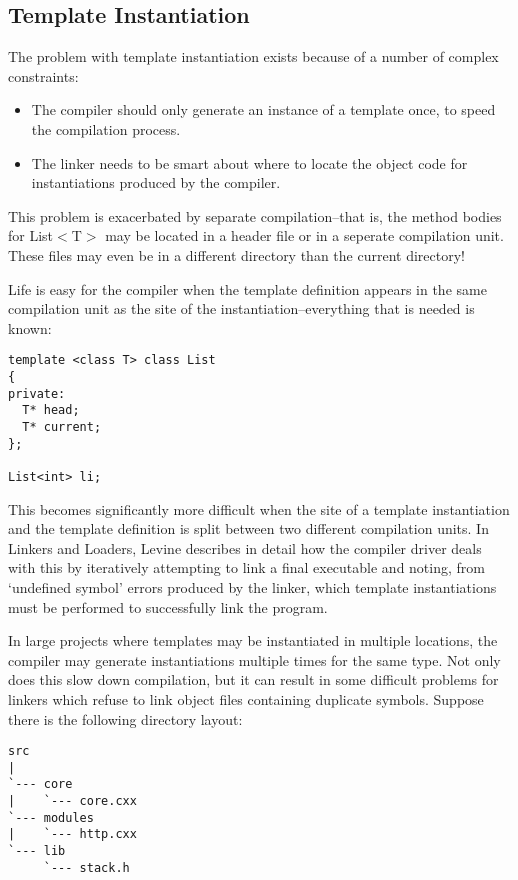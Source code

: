 \subsection{Template Instantiation}

The problem with template instantiation exists because of a number of complex constraints:

\begin{itemize}
\item The compiler should only generate an instance of a template once, to speed the compilation process.
\item The linker needs to be smart about where to locate the object code for instantiations produced by the compiler. 
\end{itemize}

This problem is exacerbated by separate compilation--that is, the method 
bodies for List$<$T$>$ may be located in a header file or in a seperate 
compilation unit. These files may even be in a different directory than the 
current directory!

Life is easy for the compiler when the template definition appears in the same compilation unit as the site of the instantiation--everything that is needed is known: 

\begin{Verbatim}[frame=single]
template <class T> class List
{
private:
  T* head;
  T* current;
};

List<int> li;
\end{Verbatim}

This becomes significantly more difficult when the site of a template instantiation and the template definition is split between two different compilation units. In Linkers and Loaders, Levine describes in detail how the compiler driver deals with this by iteratively attempting to link a final executable and noting, from `undefined symbol' errors produced by the linker, which template instantiations must be performed to successfully link the program.

In large projects where templates may be instantiated in multiple locations, the compiler may generate instantiations multiple times for the same type. Not only does this slow down compilation, but it can result in some difficult problems for linkers which refuse to link object files containing duplicate symbols. Suppose there is the following directory layout: 

\begin{Verbatim}[frame=single]
src
|
`--- core
|    `--- core.cxx
`--- modules
|    `--- http.cxx
`--- lib
     `--- stack.h
\end{Verbatim}

